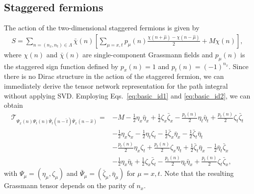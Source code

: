 \subsection{Staggered fermions}
\label{sec:staggered}

The action of the two-dimensional staggered fermions is given by
\begin{align}
	S=\sum_{n=(n_{x},n_{t})\in\Lambda}\bar{\chi}(n)\left[\sum_{\mu=x,t}p_{\mu}(n)\frac{\chi(n+\hat{\mu})-\chi(n-\hat{\mu})}{2}+M\chi(n)\right],
\end{align}
where $\chi(n)$ and $\bar{\chi}(n)$ are single-component Grassmann fields and $p_{\mu}(n)$ is the staggered sign function defined by $p_{x}(n)=1$ and $p_{t}(n)=(-1)^{n_{x}}$.
Since there is no Dirac structure in the action of the staggered fermion, we can immediately derive the tensor network representation for the path integral without applying SVD. Employing Eqs.~\eqref{eq:basic_id1} and \eqref{eq:basic_id2}, we can obtain
\begin{align}
	\mathcal{T}_{\Psi_x(n)\Psi_t(n)\bar{\Psi}_t(n-\hat{t})\bar{\Psi}_x(n-\hat{x})}
	= &-M
	-\frac{1}{2} \eta_{x}\bar{\eta}_{x}
	+\frac{1}{2} \zeta_{x}\bar{\zeta}_{x}
	-\frac{p_{t}(n)}{2} \eta_{t}\bar{\eta}_{t}
	+\frac{p_{t}(n)}{2} \zeta_{t}\bar{\zeta}_{t}
	\nonumber\\
	&-\frac{1}{2} \eta_{x}\zeta_{x}
	-\frac{1}{2} \eta_{t}\zeta_{t}
	-\frac{1}{2} \bar{\zeta}_{x}\bar{\eta}_{x}
	-\frac{1}{2} \bar{\zeta}_{t}\bar{\eta}_{t}
	\nonumber\\
	&-\frac{p_{t}(n)}{2} \eta_{x}\zeta_{t}
	+\frac{p_{t}(n)}{2} \zeta_{x}\eta_{t}
	+\frac{1}{2} \bar{\zeta}_{t}\bar{\eta}_{x}
	-\frac{1}{2} \bar{\eta}_{t}\bar{\zeta}_{x}
	\nonumber\\
	&-\frac{1}{2} \eta_{x}\bar{\eta}_{t}
	+\frac{1}{2} \zeta_{x}\bar{\zeta}_{t}
	-\frac{p_{t}(n)}{2} \eta_{t}\bar{\eta}_{x}
	+\frac{p_{t}(n)}{2} \zeta_{t}\bar{\zeta}_{x},
\end{align}
with $\Psi_\mu=(\eta_{\mu},\zeta_{\mu})$ and $\bar{\Psi}_{\mu}=(\bar{\zeta}_{\mu},\bar{\eta}_{\mu})$ for $\mu=x,t$. Note that the resulting Grassmann tensor depends on the parity of $n_{x}$.


















